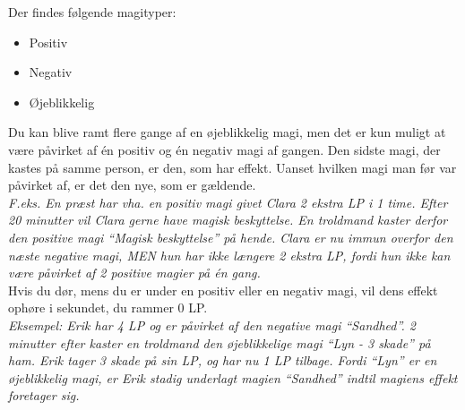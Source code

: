 Der findes følgende magityper:
\begin{itemize}
    \item Positiv
    \item Negativ
    \item Øjeblikkelig
\end{itemize}
Du kan blive ramt flere gange af en øjeblikkelig magi, men det er kun muligt at være påvirket af én positiv og én negativ magi af gangen. Den sidste magi, der kastes på samme person, er den, som har effekt. Uanset hvilken magi man før var påvirket af, er det den nye, som er gældende.\\
\textit{F.eks. En præst har vha. en positiv magi givet Clara 2 ekstra LP i 1 time. Efter 20 minutter vil Clara gerne have magisk beskyttelse. En troldmand kaster derfor den positive magi “Magisk beskyttelse” på hende. Clara er nu immun overfor den næste negative magi, MEN hun har ikke længere 2 ekstra LP, fordi hun ikke kan være påvirket af 2 positive magier på én gang.}\\
Hvis du dør, mens du er under en positiv eller en negativ magi, vil dens effekt ophøre i sekundet, du rammer 0 LP.\\
\textit{Eksempel: Erik har 4 LP og er påvirket af den negative magi “Sandhed”. 2 minutter efter kaster en troldmand den øjeblikkelige magi “Lyn - 3 skade” på ham. Erik tager 3 skade på sin LP, og har nu 1 LP tilbage. Fordi “Lyn” er en øjeblikkelig magi, er Erik stadig underlagt magien “Sandhed” indtil magiens effekt foretager sig.} \\


